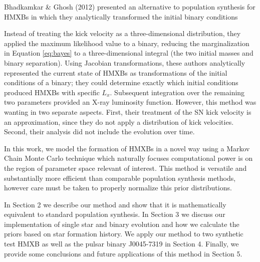\documentclass[12pt, preprint]{aastex}
\begin{document}
Bhadkamkar \& Ghosh (2012) presented an alternative to population synthesis for HMXBs in which they analytically transformed the initial binary conditions 


 Instead of treating the kick velocity as a three-dimensional distribution, they applied the maximum likelihood value to a binary, reducing the marginalization in Equation \ref{eq:bayes} to a three-dimensional integral (the two initial masses and binary separation). Using Jacobian transformations, these authors analytically represented the current state of HMXBs as transformations of the initial conditions of a binary; they could determine exactly which initial conditions produced HMXBs with specific $L_x$. Subsequent integration over the remaining two parameters provided an X-ray luminosity function. However, this method was wanting in two separate aspects. First, their treatment of the SN kick velocity is an approximation, since they do not apply a distribution of kick velocities. Second, their analysis did not include the evolution over time. 







In this work, we model the formation of HMXBs in a novel way using a Markov Chain Monte Carlo technique which naturally focuses computational power is on the region of parameter space relevant of interest. This method is versatile and substantially more efficient than comparable population synthesis methods, however care must be taken to properly normalize this prior distributions. 



In Section 2 we describe our method and show that it is mathematically equivalent to standard population synthesis. In Section 3 we discuss our implementation of single star and binary evolution and how we calculate the priors based on star formation history. We apply our method to two synthetic test HMXB as well as the pulsar binary J0045-7319 in Section 4. Finally, we provide some conclusions and future applications of this method in Section 5.
\end{document}
